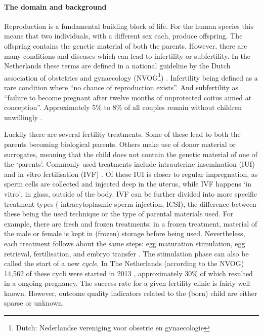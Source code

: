 \paragraph{The domain and background}
Reproduction is a fundamental building block of life.
For the human species this means that two individuals, with a different sex each, produce offspring.
The offspring contains the genetic material of both the parents.
However, there are many conditions and diseases which can lead to infertility or subfertility.
In the Netherlands these terms are defined in a national guideline by the Dutch association of obstetrics and gynaecology (NVOG\footnote{Dutch: Nederlandse vereniging voor obsetrie en gynaecologie}) \cite{subfertilityGuideline}.
Infertility being defined as a rare condition where ``no chance of reproduction exists''.
And subfertility as ``failure to become pregnant after twelve months of unprotected coitus aimed at conception''.
Approximately 5\% to 8\% of all couples remain without children unwillingly \cite{cbsStatistics, nhgStatistics}.

Luckily there are several fertility treatments.
Some of these lead to both the parents becoming biological parents. 
Others make use of donor material or surrogates, meaning that the child does not contain the genetic material of one of the `parents'.
Commonly used treatments include intrauterine insemination (IUI) and in vitro fertilisation (IVF) \cite{treatmentExplanation}.
Of these IUI is closer to regular impregnation, as sperm cells are collected and injected deep in the uterus, while IVF happens `in vitro', \ie{} in glass, outside of the body.
IVF can be further divided into more specific treatment types (\eg{} intracytoplasmic sperm injection, ICSI), 
the difference between these being the used technique or the type of parental materials used.
For example, there are fresh and frozen treatments; in a frozen treatment, material of the male or female is kept in (frozen) storage before being used.
Nevertheless, each treatment follows about the same steps: egg maturation stimulation, egg retrieval, fertilisation, and embryo transfer \cite{treatmentExplanation}.
The stimulation phase can also be called the start of a new \emph{cycle}. In The Netherlands (according to the NVOG) 14,562 of these cycli were started in 2013 \cite{ivfReportNVOG2013}, approximately 30\% of which resulted in a ongoing pregnancy.
The success rate for a given fertility clinic is fairly well known.
However, outcome quality indicators related to the (born) child are either sparse or unknown.

